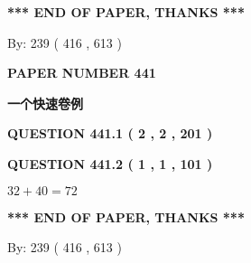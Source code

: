 \documentclass{ctexart}
\begin{document}
   
 \vspace{0.2in}
 
   
   
   
   
\vspace{1.0in} 
{\textbf{\large{ *** END OF PAPER, THANKS *** }}} 
   
   
\hspace{1.0in} By: 
 239 ( 416 ,  613 )
   
   
   
   
\newpage 
\setcounter{page}{ 
   441001 } 
   
   
   
   
 {\textbf{ \Large{ PAPER NUMBER  441  }}}
   
   
\vspace{0.2in}
   
   
   
   
   
   
 \vspace{0.2in}
{\LARGE {\textbf{ 一个快速卷例}}}
   
   
  
\vspace{0.2in}
  
{\textbf{\Large{QUESTION
441.1 
 ( 2 , 2 , 201 )
}}}
  
  
  
\vspace{0.2in}
  
{\textbf{\Large{QUESTION
441.2 
 ( 1 , 1 , 101 )
}}}
  
  
 
 

$ %
32 +  %
40=   %
72$
 
 
   
   
 \vspace{0.2in}
 
   
   
   
   
\vspace{1.0in} 
{\textbf{\large{ *** END OF PAPER, THANKS *** }}} 
   
   
\hspace{1.0in} By: 
 239 ( 416 ,  613 )
   
   
   
   
\newpage 
\setcounter{page}{ 
   442001 } 
   
   
   
\end{document}
